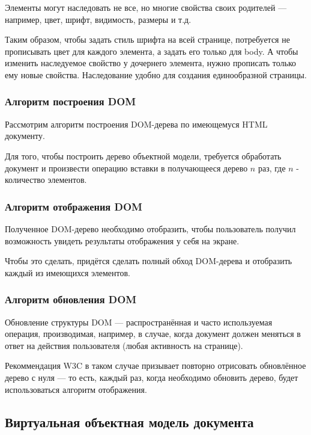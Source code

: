 \clearpage

Элементы могут наследовать не все, но многие свойства своих родителей --- например, цвет, шрифт, видимость, размеры и т.д.

Таким образом, чтобы задать стиль шрифта на всей странице, потребуется не прописывать цвет для каждого элемента, а задать его только для body. 
А чтобы изменить наследуемое свойство у дочернего элемента, нужно прописать только ему новые свойства. 
Наследование удобно для создания единообразной страницы.


\subsubsection{Алгоритм построения DOM}

Рассмотрим алгоритм построения DOM-дерева по имеющемуся HTML документу.

Для того, чтобы построить дерево объектной модели, требуется обработать документ и произвести операцию вставки в получающееся дерево $n$ раз, где $n$ - количество элементов.

\subsubsection{Алгоритм отображения DOM}

Полученное DOM-дерево необходимо отобразить, чтобы пользователь получил возможность увидеть результаты отображения у себя на экране.

Чтобы это сделать, придётся сделать полный обход DOM-дерева и отобразить каждый из имеющихся элементов.

\subsubsection{Алгоритм обновления DOM}

Обновление структуры DOM --- распространённая и часто используемая операция, производимая, например, в случае, когда документ должен меняться в ответ на действия пользователя (любая активность на странице).

Рекоммендация W3C в таком случае призывает повторно отрисовать обновлённое дерево с нуля --- то есть, каждый раз, когда необходимо обновить дерево, будет использоваться алгоритм отображения.

\clearpage

\subsection{Виртуальная объектная модель документа}

